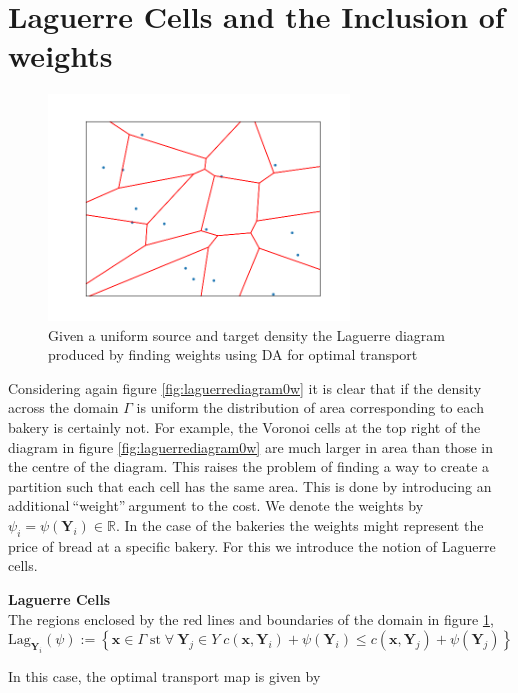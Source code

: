 \section{Laguerre Cells and the Inclusion of weights}
 \begin{figure}[h]
	\centering
	\includegraphics[width=8cm]{project/laguerre_diagram_OTw}
	\caption[Laguerre diagram produced by finding weights using DA for optimal transport]{Given a uniform source and target density the Laguerre diagram produced by finding weights using DA for optimal transport}
	\label{fig:laguerrediagramotw}
\end{figure}
Considering again figure \ref{fig:laguerrediagram0w} it is clear that if the density across the domain $\Gamma$ is uniform the distribution of area corresponding to each bakery is certainly not. For example, the Voronoi cells at the top right of the diagram in figure \ref{fig:laguerrediagram0w} are much larger in area than those in the centre of the diagram. This raises the problem of finding a way to create a partition such that each cell has the same area. This is done by introducing an additional$\ $\textquotedblleft weight\textquotedblright$\ $argument to the cost. We denote the weights by $\psi_i = \psi\left(\bm{Y}_i\right) \in \mathbb{R}$. In the case of the bakeries the weights might represent the price of bread at a specific bakery. For this we introduce the notion of Laguerre cells.\\
\begin{definition}
	\textbf{Laguerre Cells}\\
	 The regions enclosed by the red lines and boundaries of the domain in figure \ref{fig:laguerrediagramotw},  $\text{Lag}_{\bm{Y}_i}(\psi) := \left\lbrace \bm{x} \in \Gamma \; \text{st} \; \forall \ \bm{Y}_j \in Y \; c(\bm{x},\bm{Y}_i) + \psi(\bm{Y}_i) \leq c(\bm{x},\bm{Y}_j) + \psi(\bm{Y}_j) \right\rbrace$
	 \label{def: laguerre cell}
\end{definition}
In this case, the optimal transport map is given by \\
